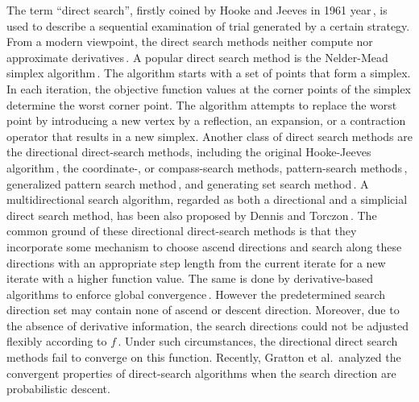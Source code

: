 \documentclass[mathpazo]{aamm}
\begin{document}
The term ``direct search'', firstly coined by Hooke and
Jeeves in 1961 year\,\cite{hooke1961direct}, is used to describe 
a sequential examination of trial generated by a
certain strategy. From a modern viewpoint, the direct search
methods neither compute nor approximate
derivatives\,\cite{lewis2000direct}. 
A popular direct search method is the
Nelder-Mead simplex algorithm\,\cite{nelder1965simplex}. The
algorithm starts with a set of points that form a simplex.
In each iteration, the objective function values at the corner
points of the simplex determine the worst corner point. The
algorithm attempts to replace the worst point by introducing a
new vertex by a reflection, an expansion, or a contraction
operator that results in a new simplex. 
Another class of direct search methods are the directional
direct-search methods, including the
original Hooke-Jeeves algorithm\,\cite{hooke1961direct}, the
coordinate-, or compass-search methods, pattern-search
methods\,\cite{conn2009introduction}, generalized 
pattern search method\,\cite{torczon1997convergence}, and 
generating set search method\,\cite{kolda2003optimization}.
A multidirectional search algorithm, regarded as both a directional and a simplicial
direct search method, has been also proposed by 
Dennis and Torczon\,\cite{dennis1991direct}.
The common ground of these directional direct-search methods is
that they incorporate some mechanism to choose ascend directions
and search along these directions with an appropriate step length
from the current iterate for a new iterate with a higher function value.
The same is done by derivative-based algorithms to
enforce global convergence\,\cite{sun2006optimization, nocedal2006numerical}.
However the predetermined search direction set 
may contain none of ascend or descent direction.
Moreover, due to the absence of derivative information, the
search directions could not be adjusted flexibly according to
$f$\,\cite{conn2009introduction}. 
Under such circumstances, the directional direct search methods
fail to converge on this function.
Recently, Gratton et al.\,\cite{gratton2015direct}
analyzed the convergent properties of direct-search algorithms
when the search direction are probabilistic descent. 
\end{document}

